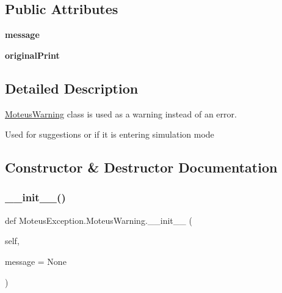 \subsection*{Public Attributes}
\begin{DoxyCompactItemize}
\item 
\mbox{\label{classMoteusException_1_1MoteusWarning_a0db4c8fb00f39bc3dbed9c81d95c9dc9}} 
{\bfseries message}
\item 
\mbox{\label{classMoteusException_1_1MoteusWarning_af953a1afc885af0ef7bbd9164925a843}} 
{\bfseries original\+Print}
\end{DoxyCompactItemize}


\subsection{Detailed Description}
\hyperlink{classMoteusException_1_1MoteusWarning}{Moteus\+Warning} class is used as a warning instead of an error. 

Used for suggestions or if it is entering simulation mode 

\subsection{Constructor \& Destructor Documentation}
\mbox{\label{classMoteusException_1_1MoteusWarning_aaf4c8f17344919a22170e3866fbef9e4}} 
\subsubsection{\texorpdfstring{\+\_\+\+\_\+init\+\_\+\+\_\+()}{\_\_init\_\_()}}
{\footnotesize\ttfamily def Moteus\+Exception.\+Moteus\+Warning.\+\_\+\+\_\+init\+\_\+\+\_\+ (\begin{DoxyParamCaption}\item[{}]{self,  }\item[{}]{message = {\ttfamily None} }\end{DoxyParamCaption})}



